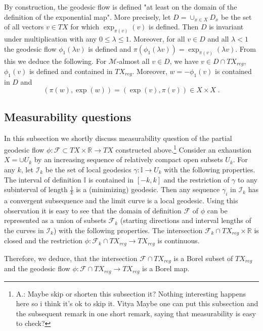 \documentclass[12pt,leqno,intlimits]{amsart}
\numberwithin{equation}{section}
\theoremstyle{definition}
\theoremstyle{remark}
\newcommand{\R}{\mathbb{R}}
\newcommand{\II}{\mathbb{I}}
\begin{document}
By construction, the geodesic flow is defined "at least on the domain of the definition of the exponential map".
More precisely, let $D=\cup _{x\in X} D_x$ be the set of all vectors $v\in TX$ for which $\exp _{\pi(v)} (v)$ is defined.
Then $D$ is invariant under multiplication with any $0\leq \lambda \leq 1$.  Moreover, for all $v\in D$ and all $\lambda <1$
the geodesic flow $\phi_1 (\lambda v)$ is defined and $\pi (\phi_1 (\lambda v))=  \exp _{\pi (v)} (\lambda v)$.
From this we deduce the following.
 For $\mathcal M$-almost all $v\in D$, we have $v\in D\cap TX_{reg}$, $\phi _1(v)$ is defined  and contained in $TX_{reg}$. Moreover,
 $w=-\phi_1 (v)$ is contained in $D$  and
\begin{equation} \label{eq:symm}
(\pi (w), \exp (w))=(\exp (v), \pi (v)) \in X\times X\; .
\end{equation}


\subsection{Measurability questions} \label{subsec:measur} 
 In this subsection we shortly discuss measurability question of the partial geodesic flow
$\phi:\mathcal F\subset TX\times \R \to TX$ constructed above.\footnote{A.:  Maybe skip or shorten this subsection it?{\color{red} Nothing interesting happens here so i think it's ok to skip it. Vitya}   Maybe one can put this subsection and the subsequent remark in one short remark, saying that 
measurability is easy to check?}
Consider an exhaustion  $X=\cup U_k$ by an increasing sequence of relatively compact open subsets $U_k$.  
For any $k$, let $\mathcal I_k$ be the set of local geodesics $\gamma :\II\to U_k$ with the following properties. 
The interval of definition $\II$ is contained in $[- k , k]$  and the restriction of $\gamma$ to any subinterval of length $\frac 1 k$ is a (minimizing) geodesic. Then any sequence $\gamma _i$ in $\mathcal I_k$ has a convergent subsequence and the limit curve is a local geodesic.  Using this observation it is easy to see that the domain of definition $\mathcal F$
of $\phi$ can be represented as a union of subsets  $\mathcal F_k$  (starting directions and interval lengths of the curves in $\mathcal I_k$) with the following properties. The intersection  $\mathcal F_k \cap TX_{reg} \times \R$ is closed and the restriction $\phi:\mathcal F_k \cap TX_{reg} \to TX_{reg}$ is continuous.

Therefore, we deduce, that the intersection $\mathcal F\cap TX_{reg}$ is a Borel subset of $TX_{reg}$ and the geodesic flow
$\phi :\mathcal F\cap TX_{reg} \to TX_{reg}$ is a Borel map.
\end{document}
